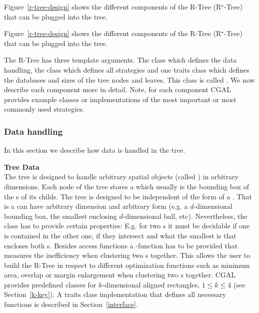 \begin{ccTexOnly}
Figure~\ref{r-tree-design} shows the different components of the
R-Tree (R$^\star $-Tree) that can be plugged into the tree. 
\end{ccTexOnly}
\begin{ccHtmlOnly}
Figure~\ref{r-tree-design} shows the different components of the
R-Tree (R$^\star $-Tree) that can be plugged into the tree. 
\end{ccHtmlOnly}
The R-Tree has three template arguments. The 
class which defines the data handling, the 
class which defines all  strategies and one traits
class which defines the databases and sizes of the tree nodes and
leaves. This class is called . We now
describe each component more in detail. Note,
for
each component CGAL provides example classes or implementations
of the most important or most commonly used strategies.

\subsubsection{Data handling}
In this section we describe how data is handled in the tree.
\medskip

\noindent
{\bf Tree Data}\\
\noindent
The tree is designed to handle arbitrary spatial objects (called
) in arbitrary dimensions.
Each node of the tree stores a  which usually is the
bounding box of the s of its childs. The tree is designed to be
independent of the form of a . 
That is a  can have arbitrary dimension and arbitrary
form (e.g. a $d$-dimensional bounding box, the smallest enclosing
$d$-dimensional ball, etc). Nevertheless, the  class has
to provide certain properties: 
E.g. for two s it must be decidable if one  is contained in
the other one, if they intersect and what the smallest 
is that encloses both s.
Besides access functions a -function has to be provided
that measures the inefficiency when clustering two s
together. This allows the user to build the R-Tree in respect to
different optimization functions such as minimum area, overlap or
margin enlargement when clustering two s together.
CGAL provides predefined
 classes for $k$-dimensional aligned rectangles, $1\le k\le
4$ (see Section~\ref{k-key}). 
A traits class implementation that defines all necessary functions is
described in Section~\ref{interface}. 
\medskip

